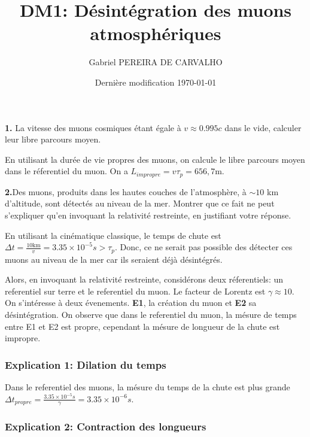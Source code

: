 \documentclass[french]{article}
\begin{document}
	\title{DM1: Désintégration des muons atmosphériques}
	\author{Gabriel PEREIRA DE CARVALHO}
	\date{Dernière modification \today}
	
	\maketitle
	
	\begin{tcolorbox}[colback=gray!5!white,colframe=gray!75!black]
		\textbf{1.} La vitesse des muons cosmiques étant égale à $v \approx 0.995c$ dans le vide, calculer leur libre parcours moyen. 
	\end{tcolorbox}

	En utilisant la durée de vie propres des muons, on calcule le libre parcours moyen dans le réferentiel du muon. On a $L_{impropre} = v \tau_p = 656,7 \mathrm{m}$.

	\begin{tcolorbox}[colback=gray!5!white,colframe=gray!75!black]
		\textbf{2.}Des muons, produits dans les hautes couches de l'atmosphère, à $\sim 10$ km d'altitude, sont détectés au niveau de la mer. Montrer que ce fait ne peut s'expliquer qu'en invoquant la relativité restreinte, en justifiant votre réponse.
	\end{tcolorbox}

	En utilisant la cinématique classique, le temps de chute est $\Delta t = \frac{10 \mathrm{km}}{v} = 3.35 \times 10^{-5}s > \tau_p$. Donc, ce ne serait pas possible des détecter ces muons au niveau de la mer car ils seraient déjà désintégrés.

	Alors, en invoquant la relativité restreinte, considérons deux réferentiels: un referentiel sur terre et le referentiel du muon. Le facteur de Lorentz est $\gamma \approx 10$. On s'intéresse à deux évenements. \textbf{E1}, la création du muon et \textbf{E2} sa désintégration. On observe que dans le referentiel du muon, la mésure de temps entre E1 et E2 est propre, cependant la mésure de longueur de la chute est impropre.

	\subsubsection*{Explication 1: Dilation du temps}
	
	Dans le referentiel des muons, la mésure du temps de la chute est plus grande $\Delta t_{propre} = \frac{3.35 \times 10^{-5}s}{\gamma} = 3.35 \times 10^{-6}s$.
	
	\subsubsection*{Explication 2: Contraction des longueurs}
	
\end{document}

